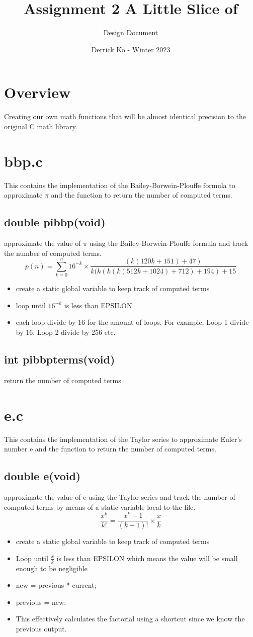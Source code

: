 \documentclass{article}
\title{Assignment 2 A Little Slice of \pi}
\author{Design Document}
\date{Derrick Ko - Winter 2023}
\begin{document}
\maketitle
\section{Overview}
Creating our own math functions that will be almost identical precision to the original C math library. 
\section{bbp.c}
This contains the implementation of the Bailey-Borwein-Plouffe formula to approximate $\pi$ and the function to return the number of computed terms.
\subsection{double pi\textunderscore bbp(void)}
approximate the value of $\pi$ using the Bailey-Borwein-Plouffe formula and track the number of computed terms.
\[ p(n) = \sum_{k=0}^{n} 16^{-k} \times \frac{(k(120k + 151) +47)}{k(k(k(k(512k +1024)+712)+194)+15} \]
\begin{itemize}
    \item create a static global variable to keep track of computed terms
    \item loop until $16^{-k}$ is less than EPSILON
    \item each loop divide by 16 for the amount of loops. For example, Loop 1 divide by 16, Loop 2 divide by 256 etc.
\end{itemize}

\subsection{int pi\textunderscore bbp\textunderscore terms(void)}
return the number of computed terms
\section{e.c}
 This contains the implementation of the Taylor series to approximate Euler’s number e and the function to return the number of computed terms.
\subsection{double e(void)}
approximate the value of e using the Taylor series and track the number of computed terms by means of a static variable local to the file.
\[ \frac{x^k}{k!} = \frac{x^k-1}{(k-1)!} \times \frac{x}{k}\]
\begin{itemize}
\item create a static global variable to keep track of computed terms
\item Loop until $\frac{x}{k}$ is less than EPSILON which means the value will be small enough to be negligible
\item new = previous * current;
\item previous = new;
\item This effectively calculates the factorial using a shortcut since we know the previous output. 
\end{itemize}
\end{document}
